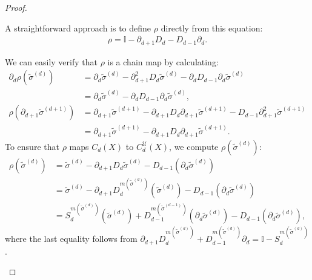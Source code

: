 \begin{proof}{\textit{\cite[Proof of Proposition 2.21]{hatcher2005algebraic}}}
\begin{enumerate}
	A straightforward approach is to define \( \rho \) directly from this equation:
	\begin{align}
		\rho = \mathbb{I} - \partial_{d+1} D_{d} - D_{d-1} \partial_{d}. 
	\end{align}
		
	We can easily verify that \( \rho \) is a chain map by calculating:
	\begin{align}
		\partial_d \rho(\tilde{\sigma}^{(d)}) & = \partial_d \tilde{\sigma}^{(d)} - \partial^2_{d+1} D_d\tilde{\sigma}^{(d)} - \partial_{d} D_{d-1} \partial_d \tilde{\sigma}^{(d)} \nonumber\\
											  &	= \partial_d \tilde{\sigma}^{(d)} - \partial_d D_{d-1} \partial_d \tilde{\sigma}^{(d)},  \\
		\rho(\partial_{d+1} \tilde{\sigma}^{(d+1)}) & = \partial_{d+1} \tilde{\sigma}^{(d+1)} - \partial_{d+1} D_{d} \partial_{d+1} \tilde{\sigma}^{(d+1)} - D_{d-1} \partial^2_{d+1} \tilde{\sigma}^{(d+1)} \nonumber\\
													& = \partial_{d+1} \tilde{\sigma}^{(d+1)} - \partial_{d+1} D_{d} \partial_{d+1} \tilde{\sigma}^{(d+1)}. 
	\end{align}
	To ensure that \( \rho \) maps \( C_d(X) \) to \( C_d^{\mathcal{U}}(X) \), we compute \( \rho(\tilde{\sigma}^{(d)}) \):
	\begin{align}
		\rho(\tilde{\sigma}^{(d)}) & = \tilde{\sigma}^{(d)} - \partial_{d+1} D_d\tilde{\sigma}^{(d)} - D_{d-1}(\partial_d \tilde{\sigma}^{(d)}) \nonumber                                                 \\
		                           & = \tilde{\sigma}^{(d)} - \partial_{d+1} D^{m(\tilde{\sigma}^{(d)})}_d(\tilde{\sigma}^{(d)}) - D_{d-1}(\partial_d \tilde{\sigma}^{(d)}) \nonumber                     \\
		                           & = S^{m(\tilde{\sigma}^{(d)})}_d(\tilde{\sigma}^{(d)}) + D_{d-1}^{m(\tilde{\sigma}^{(d-1)})}(\partial_d \tilde{\sigma}^{(d)}) - D_{d-1}(\partial_d \tilde{\sigma}^{(d)}), 
	\end{align}
	where the last equality follows from \( \partial_{d+1} D_d^{m(\tilde{\sigma}^{(d)})} + D_{d-1}^{m(\tilde{\sigma}^{(d)})} \partial_d = \mathbb{I} - S^{m(\tilde{\sigma}^{(d)})}_d \).
		

\end{enumerate}
\end{proof}
